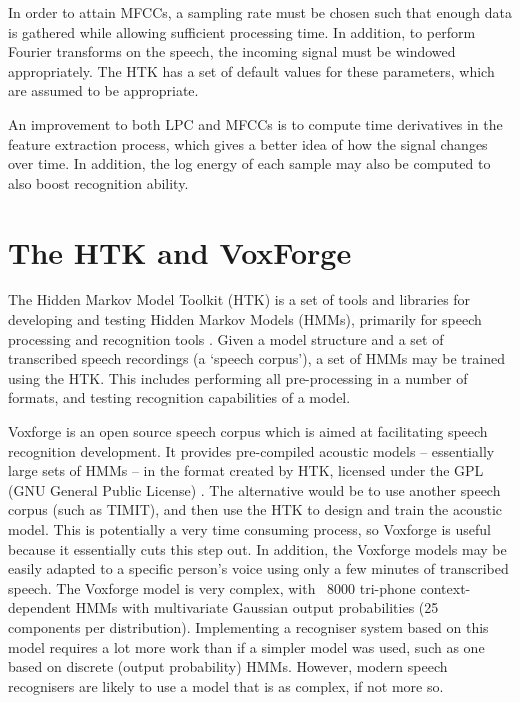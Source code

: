 	In order to attain MFCCs, a sampling rate must be chosen such that enough data is gathered while allowing sufficient processing time.  In addition, to perform Fourier transforms on the speech, the incoming signal must be windowed appropriately.  The HTK has a set of default values for these parameters, which are assumed to be appropriate.

	An improvement to both LPC and MFCCs is to compute time derivatives in the feature extraction process, which gives a better idea of how the signal changes over time.  In addition, the log energy of each sample may also be computed to also boost recognition ability.


\section{The HTK and VoxForge} %
\label{sec:the_htk}
	The Hidden Markov Model Toolkit (HTK) is a set of tools and libraries for developing and testing Hidden Markov Models (HMMs), primarily for speech processing and recognition tools \cite{htkbook}.  Given a model structure and a set of transcribed speech recordings (a `speech corpus'), a set of HMMs may be trained using the HTK.  This includes performing all pre-processing in a number of formats, and testing recognition capabilities of a model.

	Voxforge is an open source speech corpus which is aimed at facilitating speech recognition development.  It provides pre-compiled acoustic models -- essentially large sets of HMMs -- in the format created by HTK, licensed under the GPL (GNU General Public License) \cite{voxforge}.  The alternative would be to use another speech corpus (such as TIMIT), and then use the HTK to design and train the acoustic model.  This is potentially a very time consuming process, so Voxforge is useful because it essentially cuts this step out.  In addition, the Voxforge models may be easily adapted to a specific person's voice using only a few minutes of transcribed speech.  The Voxforge model is very complex, with ~8000 tri-phone context-dependent HMMs with multivariate Gaussian output probabilities (25 components per distribution).  Implementing a recogniser system based on this model requires a lot more work than if a simpler model was used, such as one based on discrete (output probability) HMMs.  However, modern speech recognisers are likely to use a model that is as complex, if not more so.


